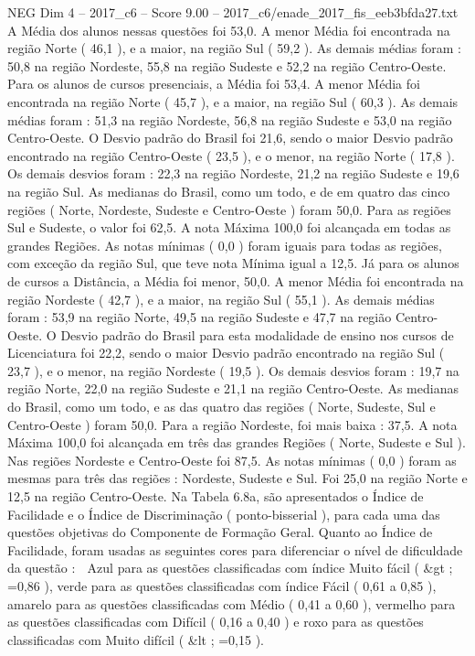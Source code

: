 \begin{textsample}{NEG Dim 4 – 2017\_c6 – Score 9.00 – 2017\_c6/enade\_2017\_fis\_eeb3bfda27.txt}
A Média dos alunos nessas questões foi 53,0.
A menor Média foi encontrada na região Norte ( 46,1 ), e a maior, na região Sul ( 59,2 ).
As demais médias foram : 50,8 na região Nordeste, 55,8 na região Sudeste e 52,2 na região Centro-Oeste.
Para os alunos de cursos presenciais, a Média foi 53,4.
A menor Média foi encontrada na região Norte ( 45,7 ), e a maior, na região Sul ( 60,3 ).
As demais médias foram : 51,3 na região Nordeste, 56,8 na região Sudeste e 53,0 na região Centro-Oeste.
O Desvio padrão do Brasil foi 21,6, sendo o maior Desvio padrão encontrado na região Centro-Oeste ( 23,5 ), e o menor, na região Norte ( 17,8 ).
Os demais desvios foram : 22,3 na região Nordeste, 21,2 na região Sudeste e 19,6 na região Sul.
As medianas do Brasil, como um todo, e de em quatro das cinco regiões ( Norte, Nordeste, Sudeste e Centro-Oeste ) foram 50,0.
Para as regiões Sul e Sudeste, o valor foi 62,5.
A nota Máxima 100,0 foi alcançada em todas as grandes Regiões.
As notas mínimas ( 0,0 ) foram iguais para todas as regiões, com exceção da região Sul, que teve nota Mínima igual a 12,5.
Já para os alunos de cursos a Distância, a Média foi menor, 50,0.
A menor Média foi encontrada na região Nordeste ( 42,7 ), e a maior, na região Sul ( 55,1 ).
As demais médias foram : 53,9 na região Norte, 49,5 na região Sudeste e 47,7 na região Centro-Oeste.
O Desvio padrão do Brasil para esta modalidade de ensino nos cursos de Licenciatura foi 22,2, sendo o maior Desvio padrão encontrado na região Sul ( 23,7 ), e o menor, na região Nordeste ( 19,5 ).
Os demais desvios foram : 19,7 na região Norte, 22,0 na região Sudeste e 21,1 na região Centro-Oeste.
As medianas do Brasil, como um todo, e as das quatro das regiões ( Norte, Sudeste, Sul e Centro-Oeste ) foram 50,0.
Para a região Nordeste, foi mais baixa : 37,5.
A nota Máxima 100,0 foi alcançada em três das grandes Regiões ( Norte, Sudeste e Sul ).
Nas regiões Nordeste e Centro-Oeste foi 87,5.
As notas mínimas ( 0,0 ) foram as mesmas para três das regiões : Nordeste, Sudeste e Sul.
Foi 25,0 na região Norte e 12,5 na região Centro-Oeste.
Na Tabela 6.8a, são apresentados o Índice de Facilidade e o Índice de Discriminação ( ponto-bisserial ), para cada uma das questões objetivas do Componente de Formação Geral.
Quanto ao Índice de Facilidade, foram usadas as seguintes cores para diferenciar o nível de dificuldade da questão :  Azul para as questões classificadas com índice Muito fácil ( \&gt ; =0,86 ), verde para as questões classificadas com índice Fácil ( 0,61 a 0,85 ), amarelo para as questões classificadas com Médio ( 0,41 a 0,60 ), vermelho para as questões classificadas com Difícil ( 0,16 a 0,40 ) e roxo para as questões classificadas com Muito difícil ( \&lt ; =0,15 ).

\end{textsample}
